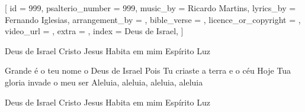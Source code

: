 
[
    id                     = {999},
    psalterio_number       = {999},
    music_by               = {Ricardo Martins},
    lyrics_by              = {Fernando Iglesias},
    arrangement_by         = {},
    bible_verse            = {},
    licence_or_copyright   = {},
    video_url              = {},
    extra                  = {},
    index                  = {Deus de Israel},
]


\beginverse

Deus de Israel
Cristo Jesus
Habita em mim
Espírito Luz

\endverse


\beginverse

Grande é o teu nome o Deus de Israel
Pois Tu criaste a terra e o céu
Hoje Tua gloria invade o meu ser
Aleluia, aleluia, aleluia, aleluia

\endverse


\beginverse

Deus de Israel
Cristo Jesus
Habita em mim
Espírito Luz

\endverse





\endsong
